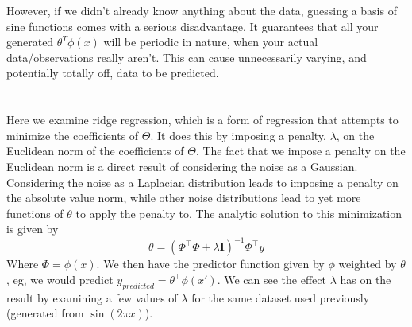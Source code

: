 \documentclass[11pt,letterpaper]{article}
\begin{document}
However, if we didn't already know anything about the data, guessing a basis of sine functions comes with a serious disadvantage. It guarantees that all your generated $\theta^T\phi(x)$ will be periodic in nature, when your actual data/observations really aren't. This can cause unnecessarily varying, and potentially totally off, data to be predicted.

\section{}

Here we examine ridge regression, which is a form of regression that attempts to minimize the coefficients of $\Theta$. It does this by imposing a penalty, $\lambda$, on the Euclidean norm of the coefficients of $\Theta$. The fact that we impose a penalty on the Euclidean norm is a direct result of considering the noise as a Gaussian. Considering the noise as a Laplacian distribution leads to imposing a penalty on the absolute value norm, while other noise distributions lead to yet more functions of $\theta$ to apply the penalty to. The analytic solution to this minimization is given by
\[ \theta = (\Phi^\intercal \Phi + \lambda \mathbf{I})^{-1}\Phi^\intercal y \]
Where $\Phi = \phi(x)$. We then have the predictor function given by $\phi$ weighted by $\theta$, eg, we would predict $y_{predicted} = \theta^\intercal \phi(x')$. We can see the effect $\lambda$ has on the result by examining a few values of $\lambda$ for the same dataset used previously (generated from $\sin(2\pi x)$).
\end{document}
